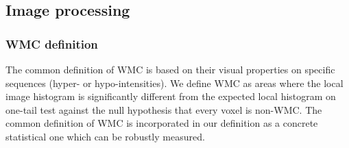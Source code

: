 \subsection{Image processing}

\subsubsection{WMC definition}
The common definition of WMC is based on their visual properties on specific sequences (hyper- or hypo-intensities). We define WMC as areas where the local image histogram is significantly different from the expected local histogram on one-tail test against the null hypothesis that every voxel is non-WMC. The common definition of WMC is incorporated in our definition as a concrete statistical one which can be robustly measured.

    
    